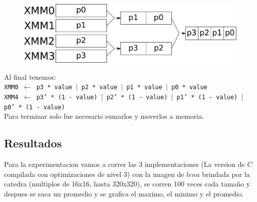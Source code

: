 \begin{figure}[h!]
	\centering
	\includegraphics[scale=0.5]{images/MergeASM2_1}
\end{figure}

Al final tenemos:\\

\noindent
\texttt{XMM0 $\gets$ p3 * value $\vert$ p2 * value $\vert$ p1 * value $\vert$ p0 * value}\\
\texttt{XMM4 $\gets$ p3' * (1 - value) $\vert$ p2' * (1 - value) $\vert$ p1' * (1 - value) $\vert$ p0' * (1 - value)}\\

Para terminar solo fue necesario sumarlos y moverlos a memoria.

\subsection{Resultados}
Para la experimentacion vamos a correr las 3 implementaciones (La version de $C$ compilada con optimizaciones de nivel 3) con la imagen de $lena$ brindada por la catedra (multiplos de 16x16, hasta 320x320), se corren 100 veces cada tamaño y despues se saca un promedio y se grafica el maximo, el minimo y el promedio.

